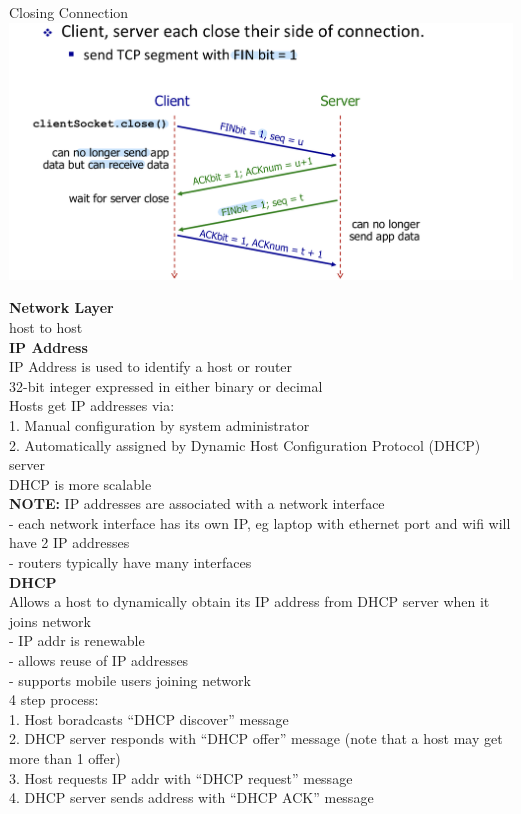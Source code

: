 \documentclass[10pt, a4paper]{article}
\newcommand{\highlight}[1]{{\color{red}\textbf{#1}}}
\newcommand{\blue}[1]{{\color{MidnightBlue}#1}}
\begin{document}
\begin{multicols*}{3}
		Closing Connection\\
		\includegraphics[scale=.14]{./assets/tcpCloseConnection}

		{\normalsize\textbf{Network Layer}}\\
		host to host\\

		\textbf{IP Address}\\
		IP Address is used to identify a host or router\\
		32-bit integer expressed in either binary or decimal\\
		Hosts get IP addresses via:\\
		1. Manual configuration by system administrator\\
		2. Automatically assigned by Dynamic Host Configuration Protocol (DHCP) server\\
		DHCP is more scalable\\
		\highlight{NOTE:} IP addresses are associated with a \blue{network interface}\\
		- each network interface has its own IP, eg laptop with ethernet port and wifi will have 2 IP addresses\\
		- routers typically have many interfaces\\
		\textbf{DHCP}\\
		Allows a host to dynamically obtain its IP address from DHCP server when it joins network\\
		- IP addr is renewable\\
		- allows reuse of IP addresses\\
		- supports mobile users joining network\\

		\blue{4 step process:}\\
		1. Host boradcasts \blue{``DHCP discover''} message\\
		2. DHCP server responds with \blue{``DHCP offer''} message (note that a host may get more than 1 offer)\\
		3. Host requests IP addr with \blue{``DHCP request''} message\\
		4. DHCP server sends address with \blue{``DHCP ACK''} message\\


\end{multicols*}
\end{document}
